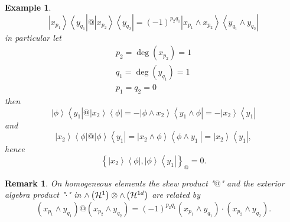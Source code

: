 \documentclass[aps,preprint]{revtex4}%
\newtheorem{example}[theorem]{Example}
\newtheorem{remark}[theorem]{Remark}
\begin{document}
\begin{example}%
\begin{equation}
\left\vert x_{p_{1}}\right\rangle \left\langle y_{q_{1}}\right\vert
@\left\vert x_{p_{2}}\right\rangle \left\langle y_{q_{2}}\right\vert =\left(
-1\right)  ^{p_{2}q_{1}}\left\vert x_{p_{1}}\wedge x_{p_{2}}\right\rangle
\left\langle y_{q_{1}}\wedge y_{q_{2}}\right\vert
\end{equation}
in particular let
\begin{gather}
p_{2}=\deg\left(  x_{p_{2}}\right)  =1\\
q_{1}=\deg\left(  y_{q_{1}}\right)  =1\\
p_{1}=q_{2}=0
\end{gather}
then
\begin{equation}
\left\vert \phi\right\rangle \left\langle y_{1}\right\vert @\left\vert
x_{2}\right\rangle \left\langle \phi\right\vert =-\left\vert \phi\wedge
x_{2}\right\rangle \left\langle y_{1}\wedge\phi\right\vert =-\left\vert
x_{2}\right\rangle \left\langle y_{1}\right\vert
\end{equation}
and
\begin{equation}
\left\vert x_{2}\right\rangle \left\langle \phi\right\vert @\left\vert
\phi\right\rangle \left\langle y_{1}\right\vert =\left\vert x_{2}\wedge
\phi\right\rangle \left\langle \phi\wedge y_{1}\ \right\vert =\left\vert
x_{2}\right\rangle \left\langle y_{1}\right\vert ,
\end{equation}
hence
\begin{equation}
\left\{  \left\vert x_{2}\right\rangle \left\langle \phi\right\vert
,\left\vert \phi\right\rangle \left\langle y_{1}\right\vert \right\}  _{@}=0.
\end{equation}

\end{example}

\begin{remark}
On \emph{homogeneous elements} the \emph{skew product} "$@$" and the exterior
algebra product "$\cdot$" in ${\huge \wedge}\left(  \mathcal{H}^{1}\right)
\otimes{\huge \wedge}\left(  \mathcal{H}^{1d}\right)  $ are related by
\begin{equation}
\left(  \overset{}{x_{p_{1}}\wedge y_{q_{1}}}\right)  @\left(
\overset{}{x_{p_{2}}\wedge y_{q_{2}}}\right)  =\left(  -1\right)  ^{p_{2}%
q_{1}}\left(  \overset{}{x_{p_{1}}\wedge y_{q_{1}}}\right)  \cdot\left(
\overset{}{x_{p_{2}}\wedge y_{q_{2}}}\right)  .
\end{equation}

\end{remark}
\end{document}
